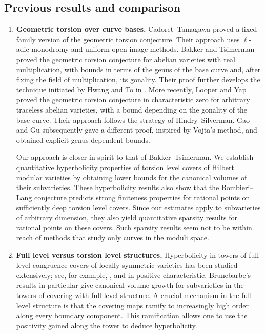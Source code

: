\documentclass[12 pt]{amsart}
\theoremstyle{definition}
\begin{document}
\subsection*{Previous results and comparison} 
\begin{enumerate}[leftmargin=*]
\item \textbf{Geometric torsion over curve bases.}
Cadoret--Tamagawa
\cite{cadoret2011weak,cadoret2012uniform} proved a fixed-family version
of the geometric torsion conjecture. Their approach uses
$\ell$-adic monodromy and uniform open-image methods. Bakker and
Tsimerman \cite{bakker2018geometric} proved the geometric torsion
conjecture for abelian varieties with real multiplication, with bounds in
terms of the genus of the base curve and, after fixing the field of
multiplication, its gonality. Their proof further develops the technique initiated by Hwang and To in \cite{hwang2002volumes,Hwangpolydisk,HwangSeshadri}. More recently, Looper and Yap \cite{looperYap2026} proved the
geometric torsion conjecture in characteristic zero for arbitrary
traceless abelian varieties, with a bound depending on the gonality of the base curve. Their approach
follows the strategy of Hindry--Silverman. Gao and Gu
\cite{gaoGu2026} subsequently gave a different proof, inspired by
Vojta's method, and obtained explicit genus-dependent bounds.

Our approach is closer in spirit to that of Bakker--Tsimerman. We
establish quantitative hyperbolicity properties of torsion level covers
of Hilbert modular varieties by obtaining lower bounds for the canonical
volumes of their subvarieties. These hyperbolicity results also show that
the Bombieri--Lang conjecture predicts strong finiteness properties for
rational points on sufficiently deep torsion level covers. Since our
estimates apply to subvarieties of arbitrary dimension, they also yield
quantitative sparsity results for rational points on these covers. Such
sparsity results seem not to be within reach of methods that study only curves
in the moduli space.

\item \textbf{Full level versus torsion level structures.}
Hyperbolicity in towers of full-level congruence covers of
locally symmetric varieties has been studied extensively; see, for
example,
\cite{nadel1989nonexistence,hwangTo2006level,
brunebarbe2020increasing,brunebarbe2020strong,
abramovich2018level,abramovich2017level,wong2025,wongYeung2025caratheodory}, and \cite{kadets2022level} in positive
characteristic. Brunebarbe's results in particular give canonical volume growth for
subvarieties in the towers of covering with full level structure. A crucial mechanism in the full level structure is that the covering maps ramify
to increasingly high order along every boundary component. This
ramification allows one to use the positivity gained along the tower to
deduce hyperbolicity.


\end{enumerate}
\end{document}

